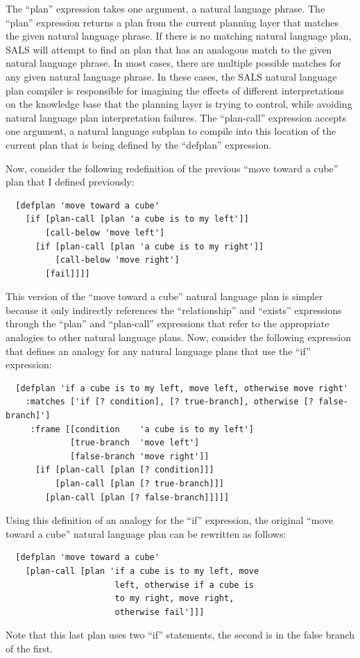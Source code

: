 The ``plan'' expression takes one argument, a natural language phrase.
The ``plan'' expression returns a plan from the current planning layer
that matches the given natural language phrase.  If there is no
matching natural language plan, SALS will attempt to find an plan that
has an analogous match to the given natural language phrase.  In most
cases, there are multiple possible matches for any given natural
language phrase.  In these cases, the SALS natural language plan
compiler is responsible for imagining the effects of different
interpretations on the knowledge base that the planning layer is
trying to control, while avoiding natural language plan interpretation
failures.  The ``plan-call'' expression accepts one argument, a
natural language subplan to compile into this location of the current
plan that is being defined by the ``defplan'' expression.

Now, consider the following redefinition of the previous ``move toward
a cube'' plan that I defined previously:
\begin{samepage}
\begin{Verbatim}
  [defplan 'move toward a cube'
    [if [plan-call [plan 'a cube is to my left']]
        [call-below 'move left']
      [if [plan-call [plan 'a cube is to my right']]
          [call-below 'move right']
        [fail]]]]
\end{Verbatim}
\end{samepage}
This version of the ``move toward a cube'' natural language plan is
simpler because it only indirectly references the ``relationship'' and
``exists'' expressions through the ``plan'' and ``plan-call''
expressions that refer to the appropriate analogies to other natural
language plans.  Now, consider the following expression that defines
an analogy for any natural language plans that use the ``if''
expression:
\begin{samepage}
\begin{Verbatim}
  [defplan 'if a cube is to my left, move left, otherwise move right'
    :matches ['if [? condition], [? true-branch], otherwise [? false-branch]']
     :frame [[condition    'a cube is to my left']
             [true-branch  'move left']
             [false-branch 'move right']]
      [if [plan-call [plan [? condition]]]
          [plan-call [plan [? true-branch]]]
        [plan-call [plan [? false-branch]]]]]
\end{Verbatim}
\end{samepage}
Using this definition of an analogy for the ``if'' expression, the
original ``move toward a cube'' natural language plan can be rewritten
as follows:
\begin{samepage}
\begin{Verbatim}
  [defplan 'move toward a cube'
    [plan-call [plan 'if a cube is to my left, move
                      left, otherwise if a cube is
                      to my right, move right,
                      otherwise fail']]]
\end{Verbatim}
\end{samepage}
Note that this last plan uses two ``if'' statements, the second is in
the false branch of the first.

